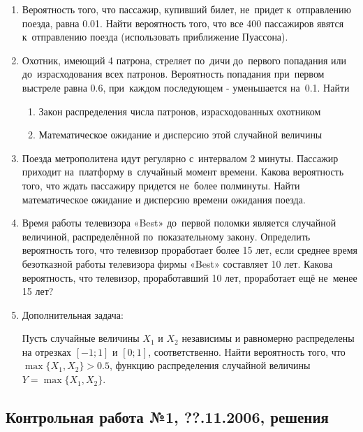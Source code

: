 \begin{enumerate}
\item  Вероятность того, что пассажир, купивший билет, не~придет к~отправлению поезда, равна 0.01. Найти вероятность того, что все
400 пассажиров явятся к~отправлению поезда (использовать
приближение Пуассона).

\item Охотник, имеющий 4 патрона, стреляет по~дичи до~первого
попадания или до~израсходования всех патронов. Вероятность
попадания при~первом выстреле равна 0.6, при~каждом последующем -
уменьшается на~0.1. Найти
\begin{enumerate}
\item Закон распределения числа патронов, израсходованных охотником
\item Математическое ожидание и дисперсию этой случайной величины
\end{enumerate}

\item Поезда метрополитена идут регулярно с~интервалом 2 минуты.
Пассажир приходит на~платформу в~случайный момент времени. Какова
вероятность того, что ждать пассажиру придется не~более полминуты.
Найти математическое ожидание и дисперсию времени ожидания поезда.

\item Время работы телевизора «Best» до~первой поломки является
случайной величиной, распределённой по~показательному закону.
Определить вероятность того, что телевизор проработает более 15
лет, если среднее время безотказной работы телевизора фирмы «Best»
составляет 10 лет. Какова вероятность, что телевизор,
проработавший 10 лет, проработает ещё не~менее 15 лет?


\item Дополнительная задача:

Пусть случайные величины $X_{1}$ и $X_{2}$ независимы и равномерно
распределены на отрезках $[-1;1]$ и $[0;1]$, соответственно. Найти
вероятность того, что $\max\{X_{1},X_{2}\}>0.5$, функцию
распределения случайной величины $Y=\max\{X_{1},X_{2}\}$.
\end{enumerate}

\subsection{Контрольная работа №1, ??.11.2006, решения}

